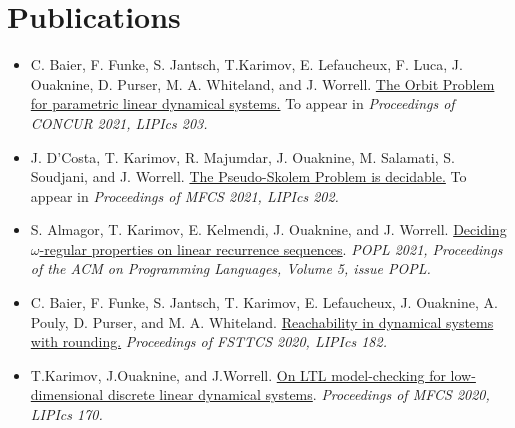 \documentclass{article}
\begin{document}
	\section*{Publications}
	\begin{itemize}
		\item C. Baier, F. Funke, S. Jantsch, T.Karimov, E. Lefaucheux, F. Luca, J. Ouaknine, D. Purser, M. A. Whiteland, and J. Worrell.
		\newline \href{https://people.mpi-sws.org/~joel/publications/semialgebraic-model-checking-LDS21abs.html}{The Orbit Problem for parametric linear dynamical systems.}
		\newline To appear in \emph{Proceedings of CONCUR 2021, LIPIcs 203.}
		
		\item J. D'Costa, T. Karimov, R. Majumdar, J. Ouaknine, M. Salamati, S. Soudjani, and J. Worrell.
		\newline \href{https://people.mpi-sws.org/~joel/publications/pseudo-skolem21abs.html}{The Pseudo-Skolem Problem is decidable.}
		\newline To appear in \emph{Proceedings of MFCS 2021, LIPIcs 202.}
		
		\item S. Almagor, T. Karimov, E. Kelmendi, J. Ouaknine, and J. Worrell.
		\newline \href{https://people.mpi-sws.org/~joel/publications/omega_LRS21abs.html}{Deciding $\omega$-regular properties on linear recurrence sequences}. 
		\newline
		\emph{POPL 2021, Proceedings of the ACM on Programming Languages, Volume 5, issue POPL.}
		
		\item C. Baier, F. Funke, S. Jantsch, T. Karimov, E. Lefaucheux, J. Ouaknine,
		A. Pouly, D. Purser, and M. A. Whiteland. 
		\newline
		\href{https://people.mpi-sws.org/~joel/publications/dynamical_systems_orbit_rounding20abs.html}{Reachability in dynamical systems with rounding.} 
		\newline \emph{Proceedings of FSTTCS 2020, LIPIcs 182.}
		
		\item T.Karimov, J.Ouaknine, and J.Worrell. 
		\newline \href{https://people.mpi-sws.org/~joel/publications/LTL_discrete_LDS20abs.html}{On LTL model-checking for low-dimensional discrete
		linear dynamical systems}. \newline \emph{Proceedings of MFCS 2020, LIPIcs 170.}
	\end{itemize}
\end{document}
